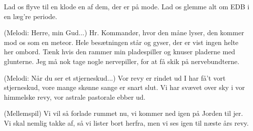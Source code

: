 \documentclass[a4paper,11pt]{article}
\begin{document}
\begin{song}
Lad os flyve til en klode
en af dem, der er på mode.
Lad os glemme alt om EDB
i en læg're periode.

(Melodi: Herre, min Gud...)
Hr. Kommandør, hvor den måne lyser,
den kommer mod os som en meteor.
Hele besætningen står og gyser,
der er vist ingen helte her ombord.
Tænk hvis den rammer min pladespiller
og knuser pladerne med glunterne.
Jeg må nok tage nogle nervepiller,
for at få skik på nervebundterne.

(Melodi: Når du ser et stjerneskud...)
Vor revy er rindet ud
I har få't vort stjerneskud,
vore mange
skønne sange
er snart slut.
Vi har svævet over sky
i vor himmelske revy,
vor astrale
pastorale
ebber ud.

(Mellemspil)
Vi vil så
forlade rummet nu,
vi kommer ned igen
på Jorden til jer.
Vi skal nemlig takke af,
så vi lister bort herfra,
men vi ses
igen til næste
års revy.
\end{song}
\end{document}
